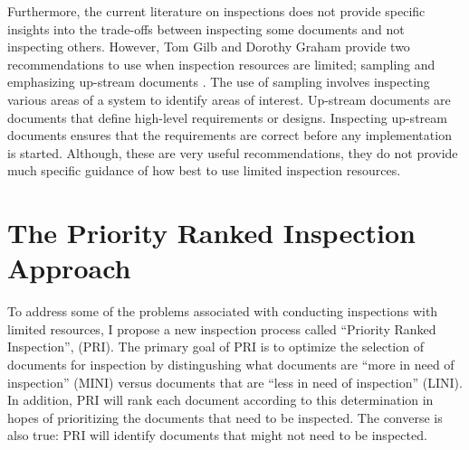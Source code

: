 Furthermore, the current literature \cite{Ebenau94, Wiegers02, Gilb93} on
inspections does not provide specific insights into the trade-offs between
inspecting some documents and not inspecting others.  However, Tom Gilb and
Dorothy Graham provide two recommendations to use when inspection resources
are limited; sampling and emphasizing up-stream documents \cite{Gilb93}.
The use of sampling involves inspecting various areas of a system to
identify areas of interest. Up-stream documents are documents that define
high-level requirements or designs.  Inspecting up-stream documents ensures
that the requirements are correct before any implementation is started.
Although, these are very useful recommendations, they do not provide much
specific guidance of how best to use limited inspection resources.



\section{The Priority Ranked Inspection Approach}
To address some of the problems associated with conducting inspections with
limited resources, I propose a new inspection process called ``Priority
Ranked Inspection'', (PRI). The primary goal of PRI is to optimize the
selection of documents for inspection by distingushing what documents are
``more in need of inspection'' (MINI) versus documents that are ``less in
need of inspection'' (LINI). In addition, PRI will rank each document
according to this determination in hopes of prioritizing the documents that
need to be inspected. The converse is also true: PRI will identify
documents that might not need to be inspected.

